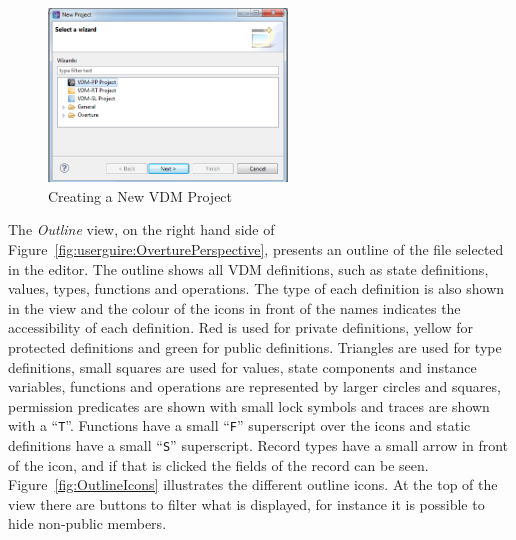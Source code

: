 \documentclass{overturerepchap}
\begin{document}
\begin{figure}[!h]
\begin{center}
  \includegraphics[width=2.5in]{figures/newovertureSLproject}
  \caption[labelInTOC]{Creating a New VDM Project}
  \label{fig:userguide:newOvertureProjectSL}
\end{center}
\end{figure}


The \emph{Outline} view, on the right hand side of
Figure~\ref{fig:userguire:OverturePerspective}, presents an outline of
the file selected
in the editor. The outline shows all VDM definitions, such as
state definitions, values, types, functions and operations. The
type of each definition is also shown in the view and the colour of
the icons in front of the names indicates the accessibility of each
definition. Red is
used for private definitions, yellow for protected definitions and
green for public definitions. Triangles are used for
type definitions, small squares are used for values, state components
and instance variables, functions and operations are represented by
larger circles and squares, permission predicates are shown with small
lock symbols and traces are shown with a
``\texttt{T}''. Functions have a small ``\texttt{F}'' superscript over the
icons and static definitions have a small ``\texttt{S}'' superscript.
Record types have a small arrow in front of the
icon, and if that is clicked the fields of the record can be seen.
Figure~\ref{fig:OutlineIcons} illustrates the different outline icons.
At the top of the view there are buttons to filter what is displayed,
for instance it is possible to hide non-public members.
\end{document}
